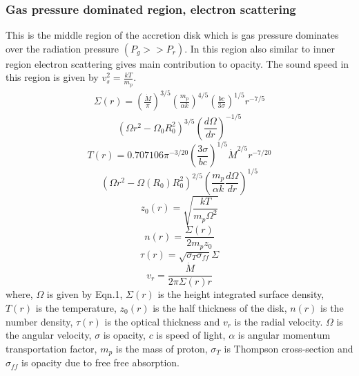 \documentclass[useAMS,usenatbib]{mn2e}
\begin{document}
\subsubsection{Gas pressure dominated region, electron scattering}
This is the middle region of the accretion disk which is gas pressure dominates over the radiation pressure $(P_g >> P_r)$. In this region also similar to inner region electron scattering gives main contribution to opacity. The sound speed in this region is given by $v^2_s = \frac{kT}{m_p}$. 
\begin{eqnarray}
\Sigma(r) = \left(\frac{\dot{M}}{\pi}\right)^{3/5}\left(\frac{m_p}{\alpha k}\right)^{4/5}\left(\frac{bc}{3\sigma}\right)^{1/5}r^{-7/5} 
\end{eqnarray}
$$ \left(\Omega r^2 -\Omega_0 R_0^2\right)^{3/5}\left(\frac{d\Omega}{dr}\right)^{-1/5}$$
\begin{equation}
T(r) = 0.707106 \pi^{-3/20}\left(\frac{3\sigma}{bc}\right)^{1/5}\dot{M}^{2/5}r^{-7/20}
\end{equation}
$$ \left(\Omega r^2 - \Omega(R_0) R_0^2\right)^{2/5}\left(\frac{m_p}{\alpha k}\frac{d\Omega}{dr}\right)^{1/5}$$
\begin{equation}
z_0(r) = \sqrt{\frac{k T}{m_p\Omega^2}}
\end{equation}
\begin{equation}
n(r) = \frac{\Sigma(r)}{2m_p z_0}
\end{equation}
\begin{equation}
\tau(r) = \sqrt{\sigma_T \sigma_{ff}}\Sigma
\end{equation}
\begin{equation}
v_r = \frac{\dot{M}}{2\pi\Sigma(r) r}
\end{equation}
where, $\Omega$ is given by Eqn.1, $\Sigma(r)$ is the height integrated surface density, $T(r)$ is the temperature, $z_0(r)$ is the half thickness of the disk, $n(r)$ is the number density, $\tau(r)$ is the optical thickness and $v_r$ is the radial velocity. $\Omega$ is the angular velocity, $\sigma$ is opacity, $c$ is speed of light, $\alpha$ is angular momentum transportation factor, $m_p$ is the mass of proton, $\sigma_T$ is Thompson cross-section and $\sigma_{ff}$ is opacity due to free free absorption.
\end{document}

